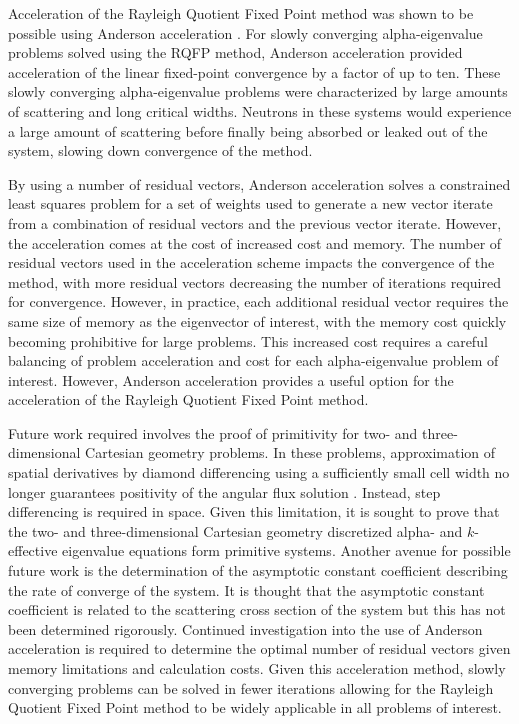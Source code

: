 Acceleration of the Rayleigh Quotient Fixed Point method was shown to be possible using Anderson acceleration \cite{walker_anderson_2011}. For slowly converging alpha-eigenvalue problems solved using the RQFP method, Anderson acceleration provided acceleration of the linear fixed-point convergence by a factor of up to ten. These slowly converging alpha-eigenvalue problems were characterized by large amounts of scattering and long critical widths. Neutrons in these systems would experience a large amount of scattering before finally being absorbed or leaked out of the system, slowing down convergence of the method.

By using a number of residual vectors, Anderson acceleration solves a constrained least squares problem for a set of weights used to generate a new vector iterate from a combination of residual vectors and the previous vector iterate. However, the acceleration comes at the cost of increased cost and memory. The number of residual vectors used in the acceleration scheme impacts the convergence of the method, with more residual vectors decreasing the number of iterations required for convergence. However, in practice, each additional residual vector requires the same size of memory as the eigenvector of interest, with the memory cost quickly becoming prohibitive for large problems. This increased cost requires a careful balancing of problem acceleration and cost for each alpha-eigenvalue problem of interest. However, Anderson acceleration provides a useful option for the acceleration of the Rayleigh Quotient Fixed Point method.

Future work required involves the proof of primitivity for two- and three-dimensional Cartesian geometry problems. In these problems, approximation of spatial derivatives by diamond differencing using a sufficiently small cell width no longer guarantees positivity of the angular flux solution \cite{greenbaum_iterative_1997}. Instead, step differencing is required in space. Given this limitation, it is sought to prove that the two- and three-dimensional Cartesian geometry discretized alpha- and $k$-effective eigenvalue equations form primitive systems. Another avenue for possible future work is the determination of the asymptotic constant coefficient describing the rate of converge of the system. It is thought that the asymptotic constant coefficient is related to the scattering cross section of the system but this has not been determined rigorously. Continued investigation into the use of Anderson acceleration is required to determine the optimal number of residual vectors given memory limitations and calculation costs. Given this acceleration method, slowly converging problems can be solved in fewer iterations allowing for the Rayleigh Quotient Fixed Point method to be widely applicable in all problems of interest.